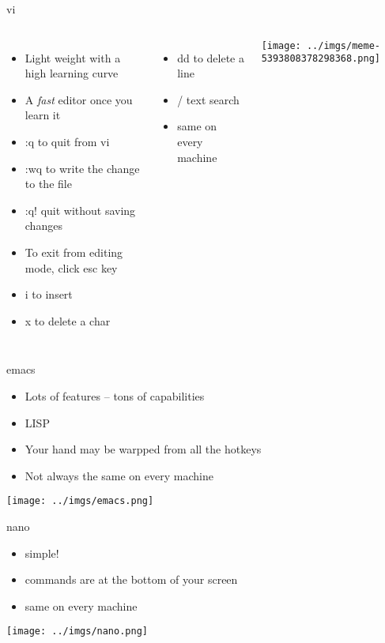 \documentclass{beamer}
\begin{document}
\begin{frame}{vi}
\begin{columns}
\begin{itemize}
\item Light weight with a high learning curve
\item A \textit{fast} editor once you learn it
\item :q to quit from vi
\item :wq  to write the change to the file
\item :q! quit without saving changes
\item To exit from editing mode, click esc key
\item i to insert
\item x to delete a char
\end{itemize}
\begin{itemize}
\item dd to delete a line
\item / text search
\item same on every machine
\end{itemize}
\texttt{[image: ../imgs/meme-5393808378298368.png]}
\end{columns}
\end{frame}

\begin{frame}{emacs}
\begin{itemize}
\item Lots of features -- tons of capabilities
\item LISP
\item Your hand may be warpped from all the hotkeys
\item Not always the same on every machine
\end{itemize}
\begin{center}
\texttt{[image: ../imgs/emacs.png]}
\end{center}
\end{frame}

\begin{frame}{nano}
\begin{itemize}
\item simple!
\item commands are at the bottom of your screen
\item same on every machine
\end{itemize}
\texttt{[image: ../imgs/nano.png]}
\end{frame}
\end{document}
